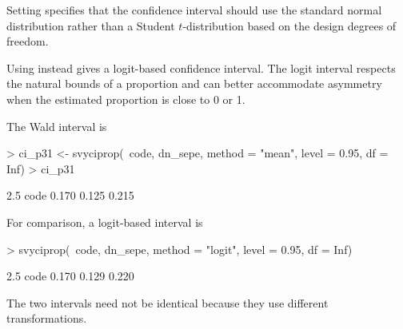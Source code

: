 \begin{Problem}
\begin{Subtask}
\begin{Rhint}
            Setting  specifies that the confidence interval
            should use the standard normal distribution rather than a Student
            $t$-distribution based on the design degrees of freedom.

            Using  instead gives a logit-based
            confidence interval. The logit interval respects the natural bounds
            of a proportion and can better accommodate asymmetry when the
            estimated proportion is close to 0 or 1.
        \end{Rhint}

    \begin{Solution}
        The Wald interval is

\begin{Schunk}
\begin{Sinput}
> ci_p31 <- svyciprop(~code, dn_sepe, method = "mean", level = 0.95, df = Inf)
> ci_p31
\end{Sinput}
\begin{Soutput}
            2.5%
code 0.170 0.125 0.215
\end{Soutput}
\end{Schunk}

        For comparison, a logit-based interval is

\begin{Schunk}
\begin{Sinput}
> svyciprop(~code, dn_sepe, method = "logit", level = 0.95, df = Inf)
\end{Sinput}
\begin{Soutput}
            2.5%
code 0.170 0.129 0.220
\end{Soutput}
\end{Schunk}

        The two intervals need not be identical because they use different
        transformations.
    \end{Solution}
\end{Subtask}
\end{Problem}
